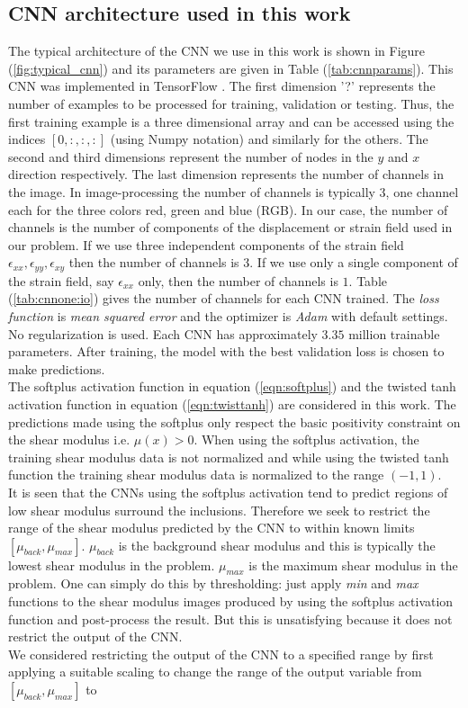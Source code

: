\documentclass[12pt]{article}
\begin{document}
\subsection{\label{sect:cnnarch} CNN architecture used in this work}
The typical architecture of the CNN we use in this work is shown in Figure (\ref{fig:typical_cnn}) and its parameters are given in Table (\ref{tab:cnnparams}). This CNN was implemented in TensorFlow \cite{misc:tensorflow}. The first dimension '?' represents the number of examples to be processed for training, validation or testing. Thus, the first training example is a three dimensional array and can be accessed using the indices $[0,:,:,:]$ (using Numpy notation) and similarly for the others. The second and third dimensions represent the number of nodes in the $y$ and $x$ direction respectively. The last dimension represents the number of channels in the image. In image-processing the number of channels is typically $3$, one channel each for the three colors red, green and blue (RGB). In our case, the number of channels is the number of components of the displacement or strain field used in our problem. If we use three independent components of the strain field $\epsilon_{xx},\epsilon_{yy},\epsilon_{xy}$ then the number of channels is $3$. If we use only a single component of the strain field, say $\epsilon_{xx}$ only, then the number of channels is $1$. Table (\ref{tab:cnnone:io}) gives the number of channels for each CNN trained. The \textit{loss function} is \textit{mean squared error} and the optimizer is \textit{Adam} with default settings. No regularization is used.  Each CNN has approximately $3.35$ million trainable parameters. After training, the model with the best validation loss is chosen to make predictions.\\The softplus activation function in equation (\ref{eqn:softplus}) and the twisted tanh activation function in equation (\ref{eqn:twisttanh}) are considered in this work. The predictions made using the softplus only respect the basic positivity constraint on the shear modulus i.e. $\mu(x) > 0$. When using the softplus activation, the training shear modulus data is not normalized and while using the twisted tanh function the training shear modulus data is normalized to the range $(-1,1)$.\\ It is seen that the CNNs using the softplus activation tend to predict regions of low shear modulus surround the inclusions. Therefore we seek to restrict the range of the shear modulus predicted by the CNN to within known limits $[\mu_{back},\mu_{max}]$. $\mu_{back}$ is the background shear modulus and this is typically the lowest shear modulus in the problem. $\mu_{max}$ is the maximum shear modulus in the problem. One can simply do this by thresholding: just apply \textit{min} and \textit{max} functions to the shear modulus images produced by using the softplus activation function and post-process the result. But this is unsatisfying because it does not restrict the output of the CNN. \\We considered restricting the output of the CNN to a specified range by first applying a suitable scaling to change the range of the output variable from $[\mu_{back},\mu_{max}]$ to 
\end{document}
